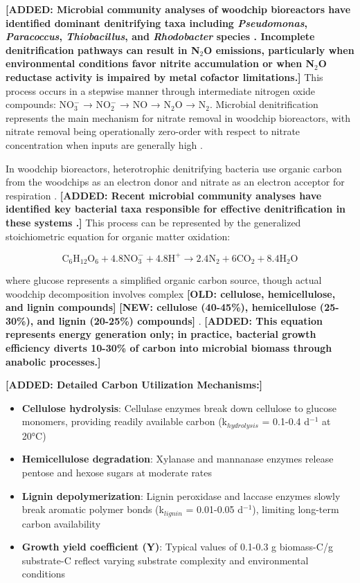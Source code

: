\documentclass[12pt,a4paper]{article}
\newcommand{\added}[1]{\textcolor{addedtext}{\textbf{[ADDED: #1]}}}
\newcommand{\replaced}[2]{\textcolor{deletedtext}{\textbf{[OLD: #1]}} \textcolor{replacedtext}{\textbf{[NEW: #2]}}}
\begin{document}
\added{Microbial community analyses of woodchip bioreactors have identified dominant denitrifying taxa including \textit{Pseudomonas}, \textit{Paracoccus}, \textit{Thiobacillus}, and \textit{Rhodobacter} species \citep{RN239, RN1185}. Incomplete denitrification pathways can result in N$_2$O emissions, particularly when environmental conditions favor nitrite accumulation or when N$_2$O reductase activity is impaired by metal cofactor limitations.} This process occurs in a stepwise manner through intermediate nitrogen oxide compounds: NO$_{3}^{-}$ → NO$_{2}^{-}$ → NO → N$_{2}$O → N$_{2}$. Microbial denitrification represents the main mechanism for nitrate removal in woodchip bioreactors, with nitrate removal being operationally zero-order with respect to nitrate concentration when inputs are generally high \citep{RN625, RN242}.

In woodchip bioreactors, heterotrophic denitrifying bacteria use organic carbon from the woodchips as an electron donor and nitrate as an electron acceptor for respiration \citep{RN242, RN725}. \added{Recent microbial community analyses have identified key bacterial taxa responsible for effective denitrification in these systems \citep{RN239, RN1185}.} This process can be represented by the generalized stoichiometric equation for organic matter oxidation:

\begin{equation}
\text{C}_6\text{H}_{12}\text{O}_6 + 4.8\text{NO}_{3}^{-} + 4.8\text{H}^{+} \rightarrow 2.4\text{N}_{2} + 6\text{CO}_{2} + 8.4\text{H}_{2}\text{O}
\end{equation}

where glucose represents a simplified organic carbon source, though actual woodchip decomposition involves complex \replaced{cellulose, hemicellulose, and lignin compounds}{cellulose (40-45\%), hemicellulose (25-30\%), and lignin (20-25\%) compounds} \citep{RN725}. \added{This equation represents energy generation only; in practice, bacterial growth efficiency diverts 10-30\% of carbon into microbial biomass through anabolic processes.}

\textcolor{addedtext}{\textbf{[ADDED: Detailed Carbon Utilization Mechanisms:]}}
\begin{itemize}
\item \textbf{Cellulose hydrolysis}: Cellulase enzymes break down cellulose to glucose monomers, providing readily available carbon (k$_{hydrolysis}$ = 0.1-0.4 d$^{-1}$ at 20°C) \citep{RN625, RN242}
\item \textbf{Hemicellulose degradation}: Xylanase and mannanase enzymes release pentose and hexose sugars at moderate rates \citep{RN625}
\item \textbf{Lignin depolymerization}: Lignin peroxidase and laccase enzymes slowly break aromatic polymer bonds (k$_{lignin}$ = 0.01-0.05 d$^{-1}$), limiting long-term carbon availability \citep{RN629}
\item \textbf{Growth yield coefficient (Y)}: Typical values of 0.1-0.3 g biomass-C/g substrate-C reflect varying substrate complexity and environmental conditions
\end{itemize}
\end{document}

